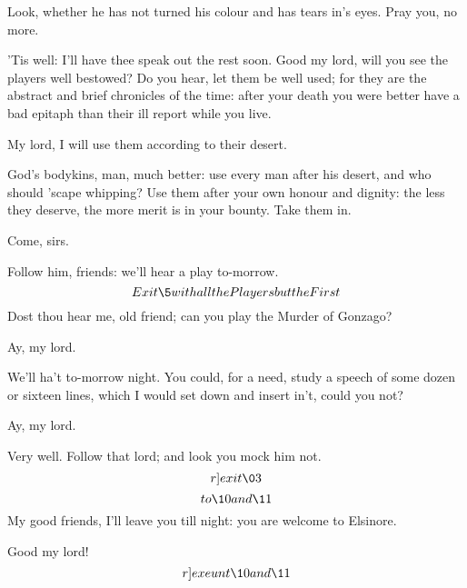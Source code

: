 \documentclass[11pt]{book}
\begin{document}
\5	Look, whether he has not turned his colour and has
	tears in's eyes. Pray you, no more.

\1	'Tis well: I'll have thee speak out the rest soon.
	Good my lord, will you see the players well
	bestowed? Do you hear, let them be well used; for
	they are the abstract and brief chronicles of the
	time: after your death you were better have a bad
	epitaph than their ill report while you live.

\5	My lord, I will use them according to their desert.

\1	God's bodykins, man, much better: use every man
	after his desert, and who should 'scape whipping?
	Use them after your own honour and dignity: the less
	they deserve, the more merit is in your bounty.
	Take them in.

\5	Come, sirs.

\1	\DriveOut* Follow him, friends: we'll hear a play to-morrow.
	\[Exit \5 with all the Players but the First\]
	Dost thou hear me, old friend; can you play the
	Murder of Gonzago?

	Ay, my lord.

\1	We'll ha't to-morrow night. You could, for a need,
	study a speech of some dozen or sixteen lines, which
	I would set down and insert in't, could you not?

	Ay, my lord.

\1	Very well. Follow that lord; and look you mock him
	not. 	\[r]exit \03\]
\[to \10 and \11\]My good friends, I'll leave you till night: you are
	welcome to Elsinore.

	Good my lord! \[r]exeunt \10 and \11 \]

\endProsa
\end{document}
